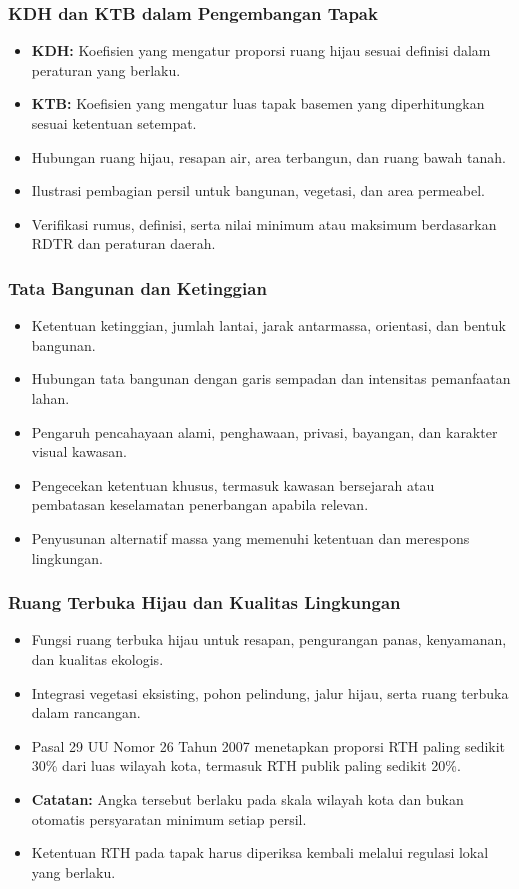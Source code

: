\documentclass[../main.tex]{subfiles}
\begin{document}
\begin{frame}[mytitle=standard, c, mycolor=white]
	\frametitle{KDH dan KTB dalam Pengembangan Tapak}
	\begin{itemize}
		\item \textbf{KDH:} Koefisien yang mengatur proporsi ruang hijau sesuai definisi dalam peraturan yang berlaku.
		\item \textbf{KTB:} Koefisien yang mengatur luas tapak basemen yang diperhitungkan sesuai ketentuan setempat.
		\item Hubungan ruang hijau, resapan air, area terbangun, dan ruang bawah tanah.
		\item Ilustrasi pembagian persil untuk bangunan, vegetasi, dan area permeabel.
		\item Verifikasi rumus, definisi, serta nilai minimum atau maksimum berdasarkan RDTR dan peraturan daerah.
	\end{itemize}
\end{frame}

\begin{frame}[mytitle=standard, t, mycolor=digiPH_cream]
	\frametitle{Tata Bangunan dan Ketinggian}
	\begin{itemize}
		\item Ketentuan ketinggian, jumlah lantai, jarak antarmassa, orientasi, dan bentuk bangunan.
		\item Hubungan tata bangunan dengan garis sempadan dan intensitas pemanfaatan lahan.
		\item Pengaruh pencahayaan alami, penghawaan, privasi, bayangan, dan karakter visual kawasan.
		\item Pengecekan ketentuan khusus, termasuk kawasan bersejarah atau pembatasan keselamatan penerbangan apabila relevan.
		\item Penyusunan alternatif massa yang memenuhi ketentuan dan merespons lingkungan.
	\end{itemize}
\end{frame}

\begin{frame}[mytitle=standard, t, mycolor=white]
	\frametitle{Ruang Terbuka Hijau dan Kualitas Lingkungan}
	\begin{itemize}
		\item Fungsi ruang terbuka hijau untuk resapan, pengurangan panas, kenyamanan, dan kualitas ekologis.
		\item Integrasi vegetasi eksisting, pohon pelindung, jalur hijau, serta ruang terbuka dalam rancangan.
		\item Pasal 29 UU Nomor 26 Tahun 2007 menetapkan proporsi RTH paling sedikit 30\% dari luas wilayah kota, termasuk RTH publik paling sedikit 20\%.
		\item \textbf{Catatan:} Angka tersebut berlaku pada skala wilayah kota dan bukan otomatis persyaratan minimum setiap persil.
		\item Ketentuan RTH pada tapak harus diperiksa kembali melalui regulasi lokal yang berlaku.
	\end{itemize}
\end{frame}
\end{document}
